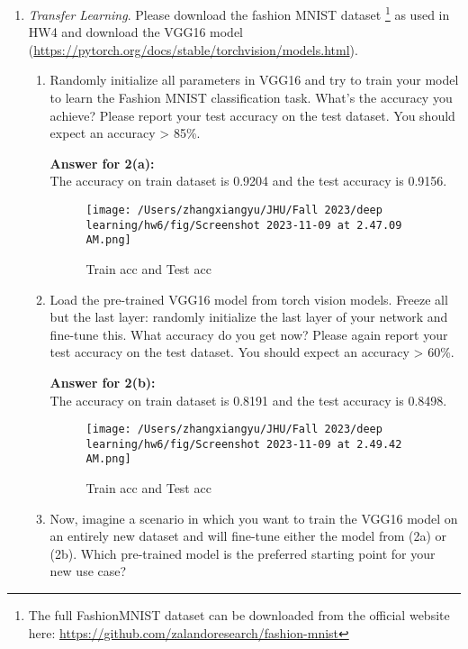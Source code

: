 \documentclass[a4paper]{article}
\begin{document}
\begin{enumerate}
\begin{enumerate}
		\end{enumerate}
	
		
		\item \textit{Transfer Learning}. Please download the fashion MNIST dataset \footnote{The full FashionMNIST dataset can be downloaded from the official website here: \url{https://github.com/zalandoresearch/fashion-mnist}} as used in HW4 and download the VGG16 model (\url{https://pytorch.org/docs/stable/torchvision/models.html}). 
		\begin{enumerate}
			\item Randomly initialize all parameters in VGG16 and try to train your model to learn the Fashion MNIST classification task. What's the accuracy you achieve? Please report your test accuracy on the test dataset. You should expect an accuracy > 85\%.
			
			\noindent \textbf{Answer for 2(a):} \\
			The accuracy on train dataset is 0.9204 and the test accuracy is 0.9156.
			\begin{figure}[H]
				\centering
				\texttt{[image: /Users/zhangxiangyu/JHU/Fall 2023/deep learning/hw6/fig/Screenshot 2023-11-09 at 2.47.09 AM.png]}
				\caption{Train acc and Test acc}
				\label{fig:1d_dice}
			\end{figure}



			\item Load the pre-trained VGG16 model from torch vision models. Freeze all but the last layer: randomly initialize the last layer of your network and fine-tune this. What accuracy do you get now? Please again report your test accuracy on the test dataset. You should expect an accuracy > 60\%.
			
			\noindent \textbf{Answer for 2(b):} \\
			The accuracy on train dataset is 0.8191 and the test accuracy is 0.8498.
			\begin{figure}[H]
				\centering
				\texttt{[image: /Users/zhangxiangyu/JHU/Fall 2023/deep learning/hw6/fig/Screenshot 2023-11-09 at 2.49.42 AM.png]}
				\caption{Train acc and Test acc}
				\label{fig:1d_dice}
			\end{figure}



			\item Now, imagine a scenario in which you want to train the VGG16 model on an entirely new dataset and will fine-tune either the model from (2a) or (2b). Which pre-trained model is the preferred starting point for your new use case?
			

\end{enumerate}
\end{enumerate}
\end{document}
